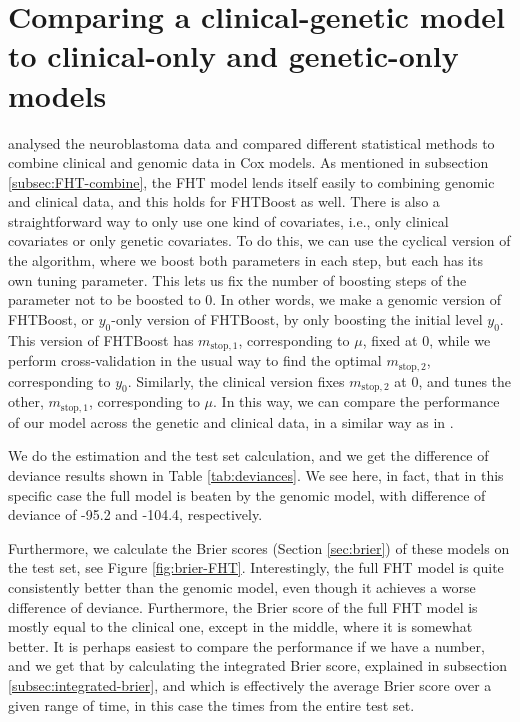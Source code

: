 \section{Comparing a clinical-genetic model to clinical-only and genetic-only models}
\citet{bovelstad2009} analysed the neuroblastoma data and compared different statistical methods to combine clinical and genomic data in Cox models.
As mentioned in subsection \ref{subsec:FHT-combine}, the FHT model lends itself easily to combining genomic and clinical data, and this holds for FHTBoost as well.
There is also a straightforward way to only use one kind of covariates, i.e., only clinical covariates or only genetic covariates.
To do this, we can use the cyclical version of the algorithm, where we boost both parameters in each step, but each has its own tuning parameter.
This lets us fix the number of boosting steps of the parameter not to be boosted to 0.
In other words, we make a genomic version of FHTBoost, or $y_0$-only version of FHTBoost, by only boosting the initial level $y_0$.
This version of FHTBoost has $m_{\text{stop},1}$, corresponding to $\mu$, fixed at 0, while we perform cross-validation in the usual way to find the optimal $m_{\text{stop},2}$, corresponding to $y_0$.
Similarly, the clinical version fixes $m_{\text{stop},2}$ at 0, and tunes the other, $m_{\text{stop},1}$, corresponding to $\mu$.
In this way, we can compare the performance of our model across the genetic and clinical data, in a similar way as in \citet{bovelstad2009}.

We do the estimation and the test set calculation, and we get the difference of deviance results shown in Table \ref{tab:deviances}.
We see here, in fact, that in this specific case the full model is beaten by the genomic model, with difference of deviance of -95.2 and -104.4, respectively.

Furthermore, we calculate the Brier scores (Section \ref{sec:brier}) of these models on the test set, see Figure \ref{fig:brier-FHT}.
Interestingly, the full FHT model is quite consistently better than the genomic model, even though it achieves a worse difference of deviance.
Furthermore, the Brier score of the full FHT model is mostly equal to the clinical one, except in the middle, where it is somewhat better.
It is perhaps easiest to compare the performance if we have a number, and we get that by calculating the integrated Brier score, explained in subsection \ref{subsec:integrated-brier}, and which is effectively the average Brier score over a given range of time, in this case the times from the entire test set.

